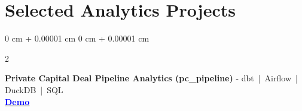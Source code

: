 \documentclass[10pt, letterpaper]{article}
\newenvironment{highlights}{
    \begin{itemize}[
        topsep=0.04 cm,
        parsep=0.02cm,
        partopsep=0pt,
        itemsep=0pt,
        leftmargin=0 cm + 10pt
    ]
}{
    \end{itemize}
} %
\newcommand{\stronglink}[2]{%
    \href{#1}{\textbf{\uline{\textcolor{blue}{#2}}}}%
}
\newenvironment{onecolentry}{
    \begin{adjustwidth}{
        0 cm + 0.00001 cm
    }{
        0 cm + 0.00001 cm
    }
}{
    \end{adjustwidth}
} %
\newenvironment{twocolentry}[2][]{
    \onecolentry
    \def\secondColumn{#2}
    \setcolumnwidth{\fill, 3.8 cm}
    \begin{paracol}{2}
}{
    \switchcolumn \raggedleft \secondColumn
    \end{paracol}
    \endonecolentry
} %
\begin{document}

    \section{Selected Analytics Projects}
        \begin{twocolentry}{
        \stronglink{https://krishuang-1116.github.io/private_capital_pipeline/}{Demo}
    }
        \textbf{Private Capital Deal Pipeline Analytics (pc\_pipeline)} -
        dbt \,|\, Airflow \,|\, DuckDB \,|\, SQL \\
        \end{twocolentry}

        \vspace{0.10cm}
\end{document}
